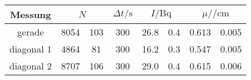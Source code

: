 \label{tab:tabWürfel2}
	\begin{tabular}{cS[table-format=4.0]@{${}\pm{}$}S[table-format=3.0]S[table-format=3.0]S[table-format=2.1]@{${}\pm{}$}S[table-format=1.1]S[table-format=1.3]@{${}\pm{}$}S[table-format=1.3]}
		\toprule
		{Messung} &  & {$\Delta t/\si{\second}$} &  &  \\
		\midrule
		 {gerade}     & 8054 & 103 & 300 & 26.8 & 0.4 & 0.613 & 0.005 \\
		 {diagonal 1} & 4864 & 81  & 300 & 16.2 & 0.3 & 0.547 & 0.005 \\
		 {diagonal 2} & 8707 & 106 & 300 & 29.0 & 0.4 & 0.615 & 0.006 \\
		\bottomrule
	\end{tabular}
